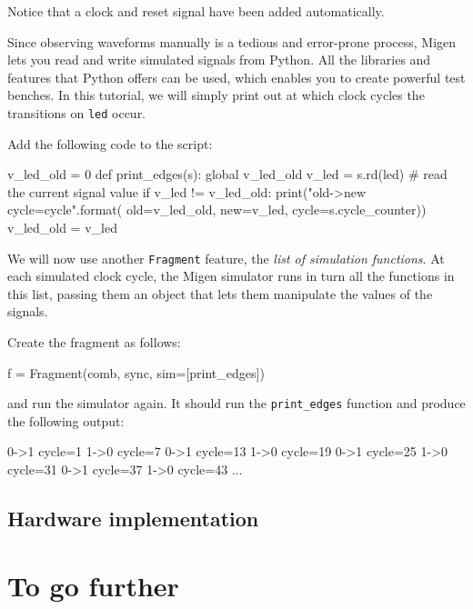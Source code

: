 \documentclass[11pt]{paper}
\begin{document}
Notice that a clock and reset signal have been added automatically.

Since observing waveforms manually is a tedious and error-prone process, Migen lets you read and write simulated signals from Python. All the libraries and features that Python offers can be used, which enables you to create powerful test benches. In this tutorial, we will simply print out at which clock cycles the transitions on \verb!led! occur.

Add the following code to the script:
\begin{verbatimtab}
v_led_old = 0
def print_edges(s):
	global v_led_old
	v_led = s.rd(led) # read the current signal value
	if v_led != v_led_old:
		print("{old}->{new} cycle={cycle}".format(
			old=v_led_old, new=v_led,
			cycle=s.cycle_counter))
		v_led_old = v_led
\end{verbatimtab}

We will now use another \verb!Fragment! feature, the \textit{list of simulation functions}. At each simulated clock cycle, the Migen simulator runs in turn all the functions in this list, passing them an object that lets them manipulate the values of the signals.

Create the fragment as follows:
\begin{verbatimtab}
f = Fragment(comb, sync, sim=[print_edges])
\end{verbatimtab}

and run the simulator again. It should run the \verb!print_edges! function and produce the following output:
\begin{verbatimtab}
0->1 cycle=1
1->0 cycle=7
0->1 cycle=13
1->0 cycle=19
0->1 cycle=25
1->0 cycle=31
0->1 cycle=37
1->0 cycle=43
...
\end{verbatimtab}


\subsection{Hardware implementation}

\section{To go further}
\end{document}
